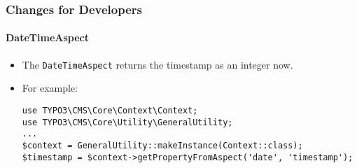 %

\begin{frame}[fragile]
	\frametitle{Changes for Developers}
	\framesubtitle{DateTimeAspect}


	\begin{itemize}
		\item The \texttt{DateTimeAspect} returns the timestamp as an integer now.
		\item For example:
\begin{lstlisting}
use TYPO3\CMS\Core\Context\Context;
use TYPO3\CMS\Core\Utility\GeneralUtility;
...
$context = GeneralUtility::makeInstance(Context::class);
$timestamp = $context->getPropertyFromAspect('date', 'timestamp');
\end{lstlisting}

	\end{itemize}

\end{frame}

